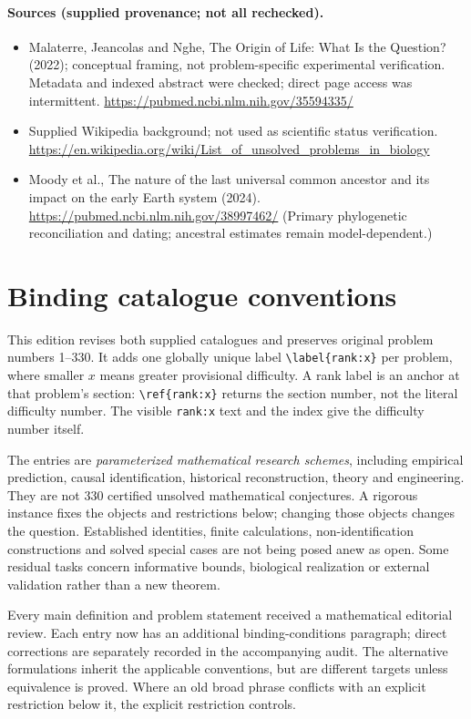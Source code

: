 \documentclass[11pt]{article}
\begin{document}
\paragraph{Sources (supplied provenance; not all rechecked).} \begin{itemize}
\item Malaterre, Jeancolas and Nghe, The Origin of Life: What Is the Question? (2022); conceptual framing, not problem-specific experimental verification. Metadata and indexed abstract were checked; direct page access was intermittent. \url{https://pubmed.ncbi.nlm.nih.gov/35594335/}
\item Supplied Wikipedia background; not used as scientific status verification. \url{https://en.wikipedia.org/wiki/List_of_unsolved_problems_in_biology}
\item Moody et al., The nature of the last universal common ancestor and its impact on the early Earth system (2024). \url{https://pubmed.ncbi.nlm.nih.gov/38997462/} (Primary phylogenetic reconciliation and dating; ancestral estimates remain model-dependent.)
\end{itemize}


\section*{Binding catalogue conventions}
This edition revises both supplied catalogues and preserves original problem numbers 1--330. It adds one globally unique label \verb|\label{rank:x}| per problem, where smaller $x$ means greater provisional difficulty. A rank label is an anchor at that problem's section: \verb|\ref{rank:x}| returns the section number, not the literal difficulty number. The visible \texttt{rank:x} text and the index give the difficulty number itself.

The entries are \emph{parameterized mathematical research schemes}, including empirical prediction, causal identification, historical reconstruction, theory and engineering. They are not 330 certified unsolved mathematical conjectures. A rigorous instance fixes the objects and restrictions below; changing those objects changes the question. Established identities, finite calculations, non-identification constructions and solved special cases are not being posed anew as open. Some residual tasks concern informative bounds, biological realization or external validation rather than a new theorem.

Every main definition and problem statement received a mathematical editorial review. Each entry now has an additional binding-conditions paragraph; direct corrections are separately recorded in the accompanying audit. The alternative formulations inherit the applicable conventions, but are different targets unless equivalence is proved. Where an old broad phrase conflicts with an explicit restriction below it, the explicit restriction controls.
\end{document}
